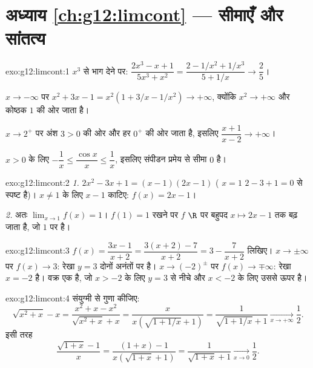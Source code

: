 \section*{अध्याय \ref{ch:g12:limcont} --- सीमाएँ और सांतत्य}

\begin{solution}{exo:g12:limcont:1}
$x^3$ से भाग देने पर: $\dfrac{2x^3 - x + 1}{5x^3 + x^2} = \dfrac{2 - 1/x^2 + 1/x^3}{5 + 1/x}
\to \dfrac{2}{5}$।

$x \to -\infty$ पर $x^2 + 3x - 1 = x^2(1 + 3/x - 1/x^2) \to +\infty$, क्योंकि $x^2 \to +\infty$ और कोष्ठक $1$ की ओर जाता है।

$x \to 2^+$ पर अंश $3 > 0$ की ओर और हर $0^+$ की ओर जाता है, इसलिए $\dfrac{x+1}{x-2} \to +\infty$।

$x > 0$ के लिए $-\dfrac1x \leq \dfrac{\cos x}{x} \leq \dfrac1x$, इसलिए संपीडन प्रमेय से सीमा $0$ है।
\end{solution}

\begin{solution}{exo:g12:limcont:2}
\emph{1.} $2x^2 - 3x + 1 = (x-1)(2x-1)$ ( $x=1$ $2 - 3 + 1 = 0$ से स्पष्ट है)। $x \neq 1$ के लिए $x - 1$ काटिए: $f(x) = 2x - 1$।

\emph{2.} अतः $\lim_{x\to1} f(x) = 1$। $f(1) = 1$ रखने पर $f$ $\R$ पर बहुपद  $x \mapsto 2x-1$ तक बढ़ जाता है,
जो $1$ पर  है।
\end{solution}

\begin{solution}{exo:g12:limcont:3}
$f(x) = \dfrac{3x - 1}{x + 2} = \dfrac{3(x+2) - 7}{x+2}
= 3 - \dfrac{7}{x+2}$ लिखिए। $x \to \pm\infty$ पर $f(x) \to 3$: रेखा $y = 3$ दोनों अनंतों पर  है।
$x \to (-2)^\pm$ पर $f(x) \to \mp\infty$: रेखा $x = -2$  है। वक्र एक  है, जो
$x > -2$ के लिए $y=3$ से नीचे और $x < -2$ के लिए उससे ऊपर है।
\end{solution}

\begin{solution}{exo:g12:limcont:4}
संयुग्मी से गुणा कीजिए:
\[
\sqrt{x^2 + x} - x = \frac{x^2 + x - x^2}{\sqrt{x^2+x} + x}
= \frac{x}{x\left(\sqrt{1 + 1/x} + 1\right)}
= \frac{1}{\sqrt{1 + 1/x} + 1}
\xrightarrow[x\to+\infty]{} \frac{1}{2}.
\]
इसी तरह
\[
\frac{\sqrt{1+x} - 1}{x} = \frac{(1+x) - 1}{x\left(\sqrt{1+x} + 1\right)}
= \frac{1}{\sqrt{1+x} + 1} \xrightarrow[x\to0]{} \frac{1}{2}.
\]
\end{solution}

